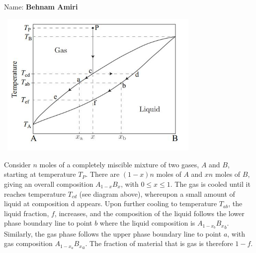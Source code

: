 \documentclass[fleqn]{article}
\begin{document}
  Name: \textbf{Behnam Amiri}

  \vspace{1cm}
  
  \begin{center}
    \includegraphics[height=7cm, width=10cm]{1.JPG}
  \end{center}

  Consider $n$ moles of a completely miscible mixture of two gases, $A$ and $B$, starting at temperature
  $T_P$. There are $(1-x)n$ moles of $A$ and $xn$ moles of $B$, giving an overall composition $A_{1-x} B_x$, with
  $0\leq x \leq  1$. The gas is cooled until it reaches temperature $T_{cd}$ (see diagram above), whereupon a
  small amount of liquid at composition d appears. Upon further cooling to temperature $T_{ab}$, the
  liquid fraction, $f$, increases, and the composition of the liquid follows the lower phase boundary
  line to point $b$ where the liquid composition is $A_{1-x_b} {B_x}_b$. Similarly, the gas phase follows
  the upper phase boundary line to point $a$, with gas composition $A_{1-x_a} {B_x}_a$. The fraction 
  of material that is gas is therefore $1-f$.
\end{document}
